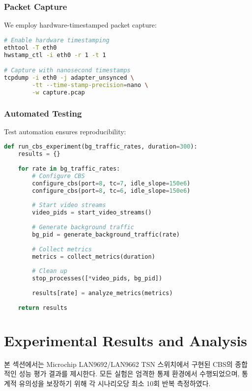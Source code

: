 \documentclass[10pt, journal, compsoc]{IEEEtran}
\begin{document}
\subsubsection{Packet Capture}

We employ hardware-timestamped packet capture:

\begin{lstlisting}[language=bash, caption=Packet Capture Setup]
# Enable hardware timestamping
ethtool -T eth0
hwstamp_ctl -i eth0 -r 1 -t 1

# Capture with nanosecond timestamps
tcpdump -i eth0 -j adapter_unsynced \
        -tt --time-stamp-precision=nano \
        -w capture.pcap
\end{lstlisting}

\subsubsection{Automated Testing}

Test automation ensures reproducibility:

\begin{lstlisting}[language=python, caption=Test Automation Script]
def run_cbs_experiment(bg_traffic_rates, duration=300):
    results = {}
    
    for rate in bg_traffic_rates:
        # Configure CBS
        configure_cbs(port=8, tc=7, idle_slope=150e6)
        configure_cbs(port=8, tc=6, idle_slope=150e6)
        
        # Start video streams
        video_pids = start_video_streams()
        
        # Generate background traffic
        bg_pid = generate_background_traffic(rate)
        
        # Collect metrics
        metrics = collect_metrics(duration)
        
        # Clean up
        stop_processes([*video_pids, bg_pid])
        
        results[rate] = analyze_metrics(metrics)
    
    return results
\end{lstlisting}

\section{Experimental Results and Analysis}
\label{sec:results}

본 섹션에서는 Microchip LAN9692/LAN9662 TSN 스위치에서 구현된 CBS의 종합적인 성능 평가 결과를 제시한다. 모든 실험은 엄격한 통제 환경에서 수행되었으며, 통계적 유의성을 보장하기 위해 각 시나리오당 최소 10회 반복 측정하였다.
\end{document}
